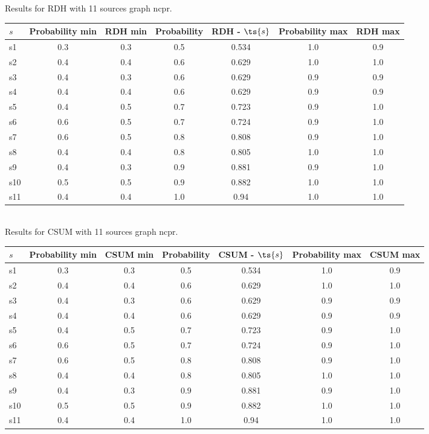 \documentclass{article}
\begin{document}
\noindent Results for RDH with 11 sources graph ncpr.

\noindent\begin{tabular}{|l|c|c|c|c|c|c|}
\hline
$s$& Probability min & RDH min & Probability & RDH - $\ts{s}$ & Probability max & RDH max\\
\hline
s1 &0.3 & 0.3 & 0.5 & 0.534 & 1.0 & 0.9\\
\hline
s2 &0.4 & 0.4 & 0.6 & 0.629 & 1.0 & 1.0\\
\hline
s3 &0.4 & 0.3 & 0.6 & 0.629 & 0.9 & 0.9\\
\hline
s4 &0.4 & 0.4 & 0.6 & 0.629 & 0.9 & 0.9\\
\hline
s5 &0.4 & 0.5 & 0.7 & 0.723 & 0.9 & 1.0\\
\hline
s6 &0.6 & 0.5 & 0.7 & 0.724 & 0.9 & 1.0\\
\hline
s7 &0.6 & 0.5 & 0.8 & 0.808 & 0.9 & 1.0\\
\hline
s8 &0.4 & 0.4 & 0.8 & 0.805 & 1.0 & 1.0\\
\hline
s9 &0.4 & 0.3 & 0.9 & 0.881 & 0.9 & 1.0\\
\hline
s10 &0.5 & 0.5 & 0.9 & 0.882 & 1.0 & 1.0\\
\hline
s11 &0.4 & 0.4 & 1.0 & 0.94 & 1.0 & 1.0\\
\hline
\end{tabular}\\

\noindent Results for CSUM with 11 sources graph ncpr.

\noindent\begin{tabular}{|l|c|c|c|c|c|c|}
\hline
$s$& Probability min & CSUM min & Probability & CSUM - $\ts{s}$ & Probability max & CSUM max\\
\hline
s1 &0.3 & 0.3 & 0.5 & 0.534 & 1.0 & 0.9\\
\hline
s2 &0.4 & 0.4 & 0.6 & 0.629 & 1.0 & 1.0\\
\hline
s3 &0.4 & 0.3 & 0.6 & 0.629 & 0.9 & 0.9\\
\hline
s4 &0.4 & 0.4 & 0.6 & 0.629 & 0.9 & 0.9\\
\hline
s5 &0.4 & 0.5 & 0.7 & 0.723 & 0.9 & 1.0\\
\hline
s6 &0.6 & 0.5 & 0.7 & 0.724 & 0.9 & 1.0\\
\hline
s7 &0.6 & 0.5 & 0.8 & 0.808 & 0.9 & 1.0\\
\hline
s8 &0.4 & 0.4 & 0.8 & 0.805 & 1.0 & 1.0\\
\hline
s9 &0.4 & 0.3 & 0.9 & 0.881 & 0.9 & 1.0\\
\hline
s10 &0.5 & 0.5 & 0.9 & 0.882 & 1.0 & 1.0\\
\hline
s11 &0.4 & 0.4 & 1.0 & 0.94 & 1.0 & 1.0\\
\hline
\end{tabular}\\
\end{document}
